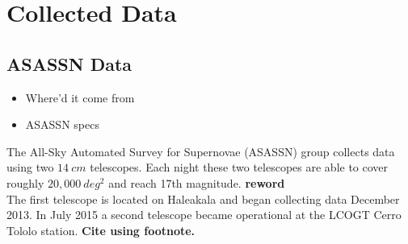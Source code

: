 \documentclass[aps,prb,twocolumn,superscriptaddress]{revtex4-1}
\begin{document}

\section{Collected Data}

\subsection{ASASSN Data}
\begin{itemize}
	\item{} Where'd it come from
	\item{} ASASSN specs
\end{itemize}


\indent The All-Sky Automated Survey for Supernovae (ASASSN) group 
collects data using two $14~cm$ telescopes. Each night these two 
telescopes are able to cover roughly $20,000~deg^{2}$ and reach 17th magnitude.
{\bf reword}\\
The first telescope is located on Haleakala and began collecting data December 
2013. In July 2015 a second telescope became operational at the LCOGT 
Cerro Tololo station. {\bf Cite using footnote.}


\end{document}

